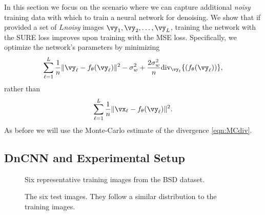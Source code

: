 \documentclass{article}
\begin{document}
In this section we focus on the scenario where we can capture additional {\em noisy} training data with which to train a neural network for denoising. 
We show that if provided a set of $L$\emph{noisy} images $\vy_1, \vy_2, \ldots, \vy_L$, 
training the network with the SURE loss improves upon training with the MSE loss. Specifically, we optimize the network's parameters by minimizing
\[
\sum_{\ell=1}^L  \frac{1}{n}\|\vy_\ell-f_\theta (\vy_\ell)\|^2-\sigma_w^2+\frac{2\sigma_w^2}{n}\text{div}_{\vy_\ell}\{(f_\theta (\vy_\ell))\},
\]
rather than 
\[
\sum_{\ell=1}^L \frac{1}{n}\|\vx_\ell-f_\theta(\vy_\ell)\|^2.
\]
As before we will use the Monte-Carlo estimate of the divergence \eqref{eqn:MCdiv}.

\subsection{DnCNN and Experimental Setup\label{sec:expsetupDnCNN}}\begin{figure}[t]
\centering
{}
\caption{Six representative training images from the BSD dataset.}\label{fig:TrainingImages}

{}
\caption{The six test images. They follow a similar distribution to the training images.} \label{fig:NaturalTestImages}



\end{figure}
\end{document}

